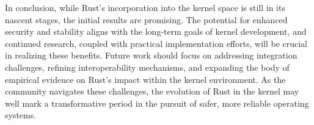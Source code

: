 \documentclass[sigconf,review,anonymous]{acmart}
\begin{document}
In conclusion, while Rust's incorporation into the kernel space is still in its nascent stages, the
initial results are promising. The potential for enhanced security and stability aligns with the
long-term goals of kernel development, and continued research, coupled with practical implementation
efforts, will be crucial in realizing these benefits. Future work should focus on addressing
integration challenges, refining interoperability mechanisms, and expanding the body of empirical
evidence on Rust's impact within the kernel environment. As the community navigates these
challenges, the evolution of Rust in the kernel may well mark a transformative period in the pursuit
of safer, more reliable operating systems.

\balance



\end{document}
